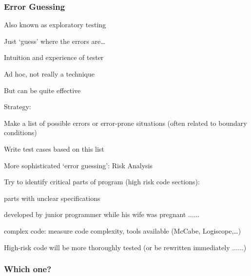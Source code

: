 \subsubsection{Error Guessing}
Also known as exploratory testing
\begin{itemize*}
	\item Just `guess’ where the errors are\ldots
	\item Intuition and experience of tester
	\item Ad hoc, not really a technique
	\item But can be quite effective
	\item Strategy:
	\begin{itemize*}
		\item Make a list of possible errors or error-prone situations (often related to boundary conditions)
		\item Write test cases based on this list
	\end{itemize*}
	\item More sophisticated `error guessing': Risk Analysis
	\item Try to identify critical parts of program
	(high risk code sections):
	\begin{itemize*}
		\item parts with unclear specifications
		\item developed by junior programmer while his wife was pregnant $\ldots\ldots$
		\item complex code:
		measure code complexity, tools available (McCabe, Logiscope,\ldots)
	\end{itemize*}
	\item High-risk code will be more thoroughly tested (or be rewritten immediately $\ldots\ldots$)

\end{itemize*}

\subsubsection{Which one?}

